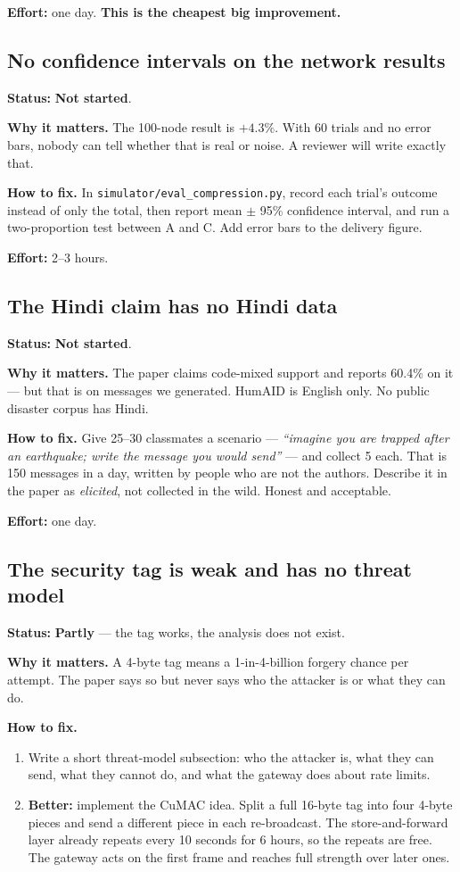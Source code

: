 \documentclass[11pt,a4paper]{article}
\newcommand{\partly}{\textcolor{warn}{\textbf{Partly}}}
\newcommand{\todo}{\textcolor{bad}{\textbf{Not started}}}
\begin{document}
\textbf{Effort:} one day. \textbf{This is the cheapest big improvement.}

\subsection{No confidence intervals on the network results}

\textbf{Status:} \todo.

\textbf{Why it matters.} The 100-node result is $+4.3\%$. With 60 trials and no
error bars, nobody can tell whether that is real or noise. A reviewer will
write exactly that.

\textbf{How to fix.} In \texttt{simulator/eval\_compression.py}, record each
trial's outcome instead of only the total, then report mean $\pm$ 95\%
confidence interval, and run a two-proportion test between A and C. Add error
bars to the delivery figure.

\textbf{Effort:} 2--3 hours.

\subsection{The Hindi claim has no Hindi data}

\textbf{Status:} \todo.

\textbf{Why it matters.} The paper claims code-mixed support and reports
60.4\% on it --- but that is on messages we generated. HumAID is English only.
No public disaster corpus has Hindi.

\textbf{How to fix.} Give 25--30 classmates a scenario --- \emph{``imagine you
are trapped after an earthquake; write the message you would send''} --- and
collect 5 each. That is 150 messages in a day, written by people who are not
the authors. Describe it in the paper as \emph{elicited}, not collected in the
wild. Honest and acceptable.

\textbf{Effort:} one day.

\subsection{The security tag is weak and has no threat model}

\textbf{Status:} \partly{} --- the tag works, the analysis does not exist.

\textbf{Why it matters.} A 4-byte tag means a 1-in-4-billion forgery chance
per attempt. The paper says so but never says who the attacker is or what they
can do.

\textbf{How to fix.}
\begin{enumerate}
\item Write a short threat-model subsection: who the attacker is, what they can
      send, what they cannot do, and what the gateway does about rate limits.
\item \textbf{Better:} implement the CuMAC idea. Split a full 16-byte tag into
      four 4-byte pieces and send a different piece in each re-broadcast. The
      store-and-forward layer already repeats every 10 seconds for 6 hours, so
      the repeats are free. The gateway acts on the first frame and reaches
      full strength over later ones.
\end{enumerate}
\end{document}
